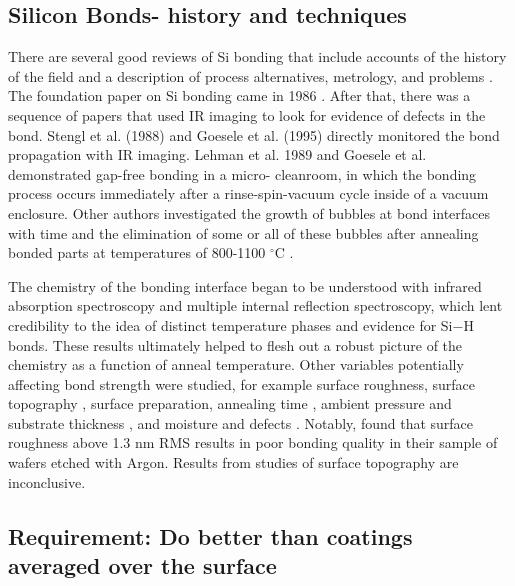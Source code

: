 \documentclass[osajnl,preprint,showpacs,superscriptaddress,12pt]{revtex4-1} %
\begin{document}
\subsection{Silicon Bonds- history and techniques}

There are several good reviews of Si bonding that include accounts of the history of the field and a description of process alternatives, metrology, and problems \cite{1998AnRMS..28..215G,Masteika2014}.  The foundation paper on Si bonding came in 1986 \cite{1986JAP....60.2987S}. After that, there was a sequence of papers that used IR imaging to look for evidence of defects in the bond. Stengl et al. (1988) and Goesele et al. (1995) \cite{1988JaJAP..27L2364S, 1995ApPhL..67.3614G} directly monitored the bond propagation with IR imaging. Lehman et al. 1989 and Goesele et al. \cite{1989JaJAP..28L2141L, 1995ApPhL..67.3614G} demonstrated gap-free bonding in a micro- cleanroom, in which the bonding process occurs immediately after a rinse-spin-vacuum cycle inside of a vacuum enclosure.  Other authors investigated the growth of bubbles at bond interfaces with time and the elimination of some or all of these bubbles after annealing bonded parts at temperatures of 800-1100 $^\circ$C \cite{Horn2009, Masteika2014}.

The chemistry of the bonding interface began to be understood with infrared absorption spectroscopy and multiple internal reflection spectroscopy\cite{feijoo1994}, which lent credibility to the idea of distinct temperature phases and evidence for Si$-$H bonds\cite{1995ApPhA..61..101R}.  These results ultimately helped to flesh out a robust picture of the chemistry as a function of anneal temperature\cite{1996JaJAP..35.2102R, 1998AnRMS..28..215G}.  Other variables potentially affecting bond strength were studied, for example surface roughness\cite{JJAP.37.4197}, surface topography \cite{2001JOptA...3...85G}, surface preparation\cite{1996ApPhL..68.2222T}, annealing time \cite{2000JAP....88.4404H}, ambient pressure and substrate thickness \cite{1995ApPhL..67..863G, 2007ApOpt..46.6793H}, and moisture and defects \cite{2001JAP....89.6013L}.  Notably, \cite{JJAP.37.4197} found that surface roughness above 1.3 nm RMS results in poor bonding quality in their sample of wafers etched with Argon.  Results from studies of surface topography are inconclusive\cite{2001JOptA...3...85G}.

\subsection{Requirement:  Do better than coatings averaged over the surface}
\end{document}
